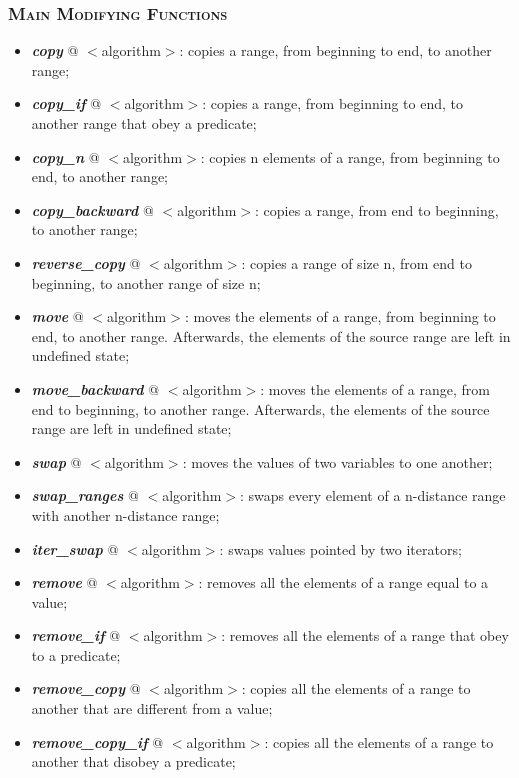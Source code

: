 \documentclass[10pt]{article}
\begin{document}
\begin{multicols*}{5}
{{\subsubsection*{\textsc{Main Modifying Functions}} 
\begin{itemize}[leftmargin=*,topsep=0.25pt]
  \setlength\itemsep{-1.8pt}
	\item  \emph{\textbf{copy}} @ $<$algorithm$>$: copies a range, from beginning to end, to another range;
	\item  \emph{\textbf{copy\_if}} @ $<$algorithm$>$: copies a range, from beginning to end, to another range that obey a predicate;
	\item  \emph{\textbf{copy\_n}} @ $<$algorithm$>$: copies n elements of a range, from beginning to end, to another range;
	\item  \emph{\textbf{copy\_backward}} @ $<$algorithm$>$: copies a range, from end to beginning, to another range;
	\item  \emph{\textbf{reverse\_copy}} @ $<$algorithm$>$: copies a range of size n, from end to beginning, to another range of size n;
	\item  \emph{\textbf{move}} @ $<$algorithm$>$: moves the elements of a range, from beginning to end, to another range. Afterwards, the elements of the source range are left in undefined state;
	\item  \emph{\textbf{move\_backward}} @ $<$algorithm$>$: moves the elements of a range, from end to beginning, to another range. Afterwards, the elements of the source range are left in undefined state;
	\item  \emph{\textbf{swap}} @ $<$algorithm$>$: moves the values of two variables to one another;
	\item  \emph{\textbf{swap\_ranges}} @ $<$algorithm$>$: swaps every element of a n-distance range with another n-distance range;
	\item  \emph{\textbf{iter\_swap}} @ $<$algorithm$>$: swaps values pointed by two iterators;
		\item  \emph{\textbf{remove}} @ $<$algorithm$>$: removes all the elements of a range equal to a value;
	\item  \emph{\textbf{remove\_if}} @ $<$algorithm$>$: removes all the elements of a range that obey to a predicate; 
	\item  \emph{\textbf{remove\_copy}} @ $<$algorithm$>$: copies all the elements of a range to another that are different from a value;
	\item  \emph{\textbf{remove\_copy\_if}} @ $<$algorithm$>$: copies all the elements of a range to another that disobey a predicate; 

\end{itemize}}}
\end{multicols*}
\end{document}
